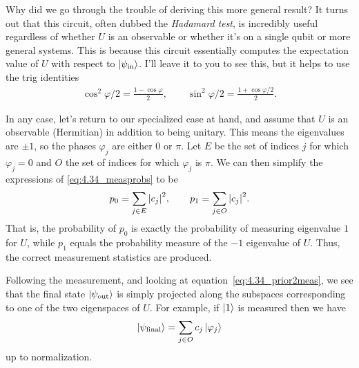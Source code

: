 \documentclass{book}
\begin{document}
    Why did we go through the trouble of deriving this more general result? It turns out that this circuit, often dubbed the \emph{Hadamard test}, is incredibly useful regardless of whether $U$ is an observable or whether it's on a single qubit or more general systems. This is because this circuit essentially computes the expectation value of $U$ with respect to $\ket{\psi_\text{in}}$. I'll leave it to you to see this, but it helps to use the trig identities
    \begin{align}
        \cos^2 \varphi/2 = \frac{1-\cos\varphi}{2}, \qquad \sin^2 \varphi/2 = \frac{1 + \cos\varphi/2}{2}.
    \end{align}

    In any case, let's return to our specialized case at hand, and assume that $U$ is an observable (Hermitian) in addition to being unitary. This means the eigenvalues are $\pm 1$, so the phases $\varphi_j$ are either $0$ or $\pi$. Let $E$ be the set of indices $j$ for which $\varphi_j = 0$ and $O$ the set of indices for which $\varphi_j$ is $\pi$. We can then simplify the expressions of \eqref{eq:4.34_measprobs} to be
    \begin{align}
        p_0 = \sum_{j \in E} \abs{c_j}^2, \qquad p_1 = \sum_{j \in O} \abs{c_j}^2.
    \end{align}
    That is, the probability of $p_0$ is exactly the probability of measuring eigenvalue $1$ for $U$, while $p_1$ equals the probability measure of the $-1$ eigenvalue of $U$. Thus, the correct measurement statistics are produced.

    Following the measurement, and looking at equation~\eqref{eq:4.34_prior2meas}, we see that the final state $\ket{\psi_\text{out}}$ is simply projected along the subspaces corresponding to one of the two eigenspaces of $U$. For example, if $\ket{1}$ is measured then we have
    \begin{align}
        \ket{\psi_\text{final}} = \sum_{j\in O} c_j \ket{\varphi_j} 
    \end{align}
    up to normalization.
\end{document}
